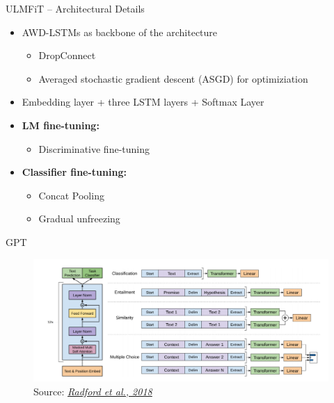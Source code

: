 \documentclass[]{beamer}
\begin{document}
\begin{frame}{ULMFiT -- Architectural Details}

	\begin{itemize}
		\item AWD-LSTMs \href{https://arxiv.org/pdf/1708.02182.pdf}{} as backbone of the architecture
			\begin{itemize}
				\item DropConnect \href{http://proceedings.mlr.press/v28/wan13.pdf}{}
				\item Averaged stochastic gradient descent (ASGD) for optimiziation
			\end{itemize}
		\item Embedding layer + three LSTM layers + Softmax Layer
		\item \textbf{LM fine-tuning:}
			\begin{itemize}
				\item Discriminative fine-tuning 
			\end{itemize}
		\item \textbf{Classifier fine-tuning:}
			\begin{itemize}
				\item Concat Pooling
				\item Gradual unfreezing
			\end{itemize}
	\end{itemize}
\end{frame}



\begin{frame}{GPT \href{https://s3-us-west-2.amazonaws.com/openai-assets/research-covers/language-unsupervised/language_understanding_paper.pdf}{}}
	\begin{figure}
		\centering
		\includegraphics[width = 12cm]{figure/gpt}\\ 
		\footnotesize{Source:} \href{https://s3-us-west-2.amazonaws.com/openai-assets/research-covers/language-unsupervised/language_understanding_paper.pdf}{\footnotesize \it Radford et al., 2018}
	\end{figure}
\end{frame}
\end{document}
